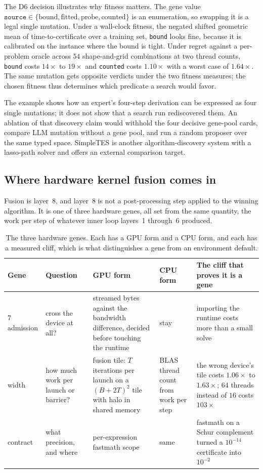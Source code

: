 The D6 decision illustrates why fitness matters. The gene value
$\texttt{source} \in \{\text{bound}, \text{fitted}, \text{probe},
\text{counted}\}$ is an enumeration, so swapping it is a legal single
mutation. Under a wall-clock fitness, the negated shifted geometric mean
of time-to-certificate over a training set, \texttt{bound} looks fine,
because it is calibrated on the instance where the bound is tight. Under
regret against a per-problem oracle across $54$ shape-and-grid
combinations at two thread counts, \texttt{bound} costs $14\times$ to
$19\times$ and \texttt{counted} costs $1.10\times$ with a worst case of
$1.64\times$. The same mutation gets opposite verdicts under the two
fitness measures; the chosen fitness thus determines which predicate a search
would favor.

The example shows how an expert's four-step derivation can be expressed as
four single mutations; it does not show that a search run rediscovered them.
An ablation of that discovery claim would withhold the four decisive gene-pool
cards, compare LLM mutation without a gene pool, and run a random proposer
over the same typed space. SimpleTES \citep{Ye2026StructuredScaling} is another
algorithm-discovery system with a lasso-path solver and offers an external
comparison target.

\subsection{Where hardware kernel fusion comes in}
\label{sec:method:hardware}

Fusion is layer~8, and layer~8 is not a post-processing step applied to
the winning algorithm. It is one of three hardware genes, all set from the
same quantity, the work per step of whatever inner loop layers~1
through~6 produced.

\begin{table}[htbp]\centering\footnotesize
\caption{The three hardware genes. Each has a GPU form and a CPU form, and
each has a measured cliff, which is what distinguishes a gene from an
environment default.}
\label{tab:hwgenes}
\begin{tabular}{@{}p{1.42cm}p{1.95cm}p{3.35cm}p{2.35cm}p{2.95cm}@{}}
\toprule
Gene & Question & GPU form & CPU form & The cliff that proves it is a gene \\
\midrule
7 admission &
cross the device at all? &
streamed bytes against the bandwidth difference, decided before touching
the runtime &
stay &
importing the runtime costs more than a small solve \\
\addlinespace
8 width &
how much work per launch or barrier? &
fusion tile: $T$ iterations per launch on a $(B{+}2T)^2$ tile with halo in
shared memory &
BLAS thread count from work per step &
the wrong device's tile costs $1.06\times$ to $1.63\times$; $64$ threads
instead of $16$ costs $103\times$ \\
\addlinespace
6 contract &
what precision, and where &
per-expression fastmath scope &
same &
fastmath on a Schur complement turned a $10^{-14}$ certificate into
$10^{-2}$ \\
\bottomrule
\end{tabular}
\end{table}

